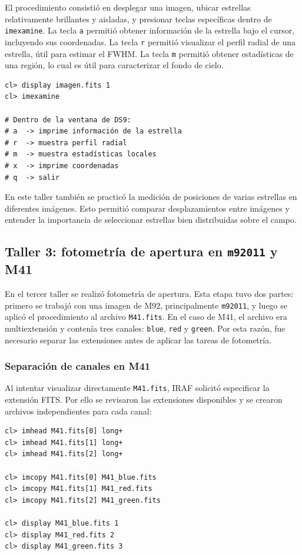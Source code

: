 \documentclass[12pt,letterpaper]{article}
\begin{document}
El procedimiento consistió en desplegar una imagen, ubicar estrellas relativamente brillantes y aisladas, y presionar teclas específicas dentro de \texttt{imexamine}. La tecla \texttt{a} permitió obtener información de la estrella bajo el cursor, incluyendo sus coordenadas. La tecla \texttt{r} permitió visualizar el perfil radial de una estrella, útil para estimar el FWHM. La tecla \texttt{m} permitió obtener estadísticas de una región, lo cual es útil para caracterizar el fondo de cielo.

\begin{lstlisting}
cl> display imagen.fits 1
cl> imexamine

# Dentro de la ventana de DS9:
# a  -> imprime información de la estrella
# r  -> muestra perfil radial
# m  -> muestra estadísticas locales
# x  -> imprime coordenadas
# q  -> salir
\end{lstlisting}

En este taller también se practicó la medición de posiciones de varias estrellas en diferentes imágenes. Esto permitió comparar desplazamientos entre imágenes y entender la importancia de seleccionar estrellas bien distribuidas sobre el campo.


\subsection{Taller 3: fotometría de apertura en \texttt{m92011} y M41}

En el tercer taller se realizó fotometría de apertura. Esta etapa tuvo dos partes: primero se trabajó con una imagen de M92, principalmente \texttt{m92011}, y luego se aplicó el procedimiento al archivo \texttt{M41.fits}. En el caso de M41, el archivo era multiextensión y contenía tres canales: \texttt{blue}, \texttt{red} y \texttt{green}. Por esta razón, fue necesario separar las extensiones antes de aplicar las tareas de fotometría.

\subsubsection{Separación de canales en M41}

Al intentar visualizar directamente \texttt{M41.fits}, IRAF solicitó especificar la extensión FITS. Por ello se revisaron las extensiones disponibles y se crearon archivos independientes para cada canal:

\begin{lstlisting}
cl> imhead M41.fits[0] long+
cl> imhead M41.fits[1] long+
cl> imhead M41.fits[2] long+

cl> imcopy M41.fits[0] M41_blue.fits
cl> imcopy M41.fits[1] M41_red.fits
cl> imcopy M41.fits[2] M41_green.fits

cl> display M41_blue.fits 1
cl> display M41_red.fits 2
cl> display M41_green.fits 3
\end{lstlisting}
\end{document}
